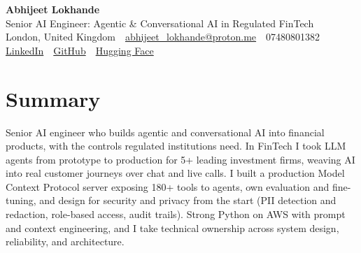 \documentclass[10pt,a4paper]{article}
\newcommand{\sep}{\,\textcolor{accent!60}{\textbar}\,}
\begin{document}
\begin{center}
  {\fontsize{24}{26}\selectfont\bfseries Abhijeet Lokhande}\\[3pt]
  {\color{accent}\large Senior AI Engineer: Agentic \& Conversational AI in Regulated FinTech}\\[5pt]
  {\small
    London, United Kingdom \sep
    \href{mailto:abhijeet_lokhande@proton.me}{abhijeet\_lokhande@proton.me} \sep
    07480801382 \\[2pt]
    \href{https://www.linkedin.com/in/ablds/}{LinkedIn} \sep
    \href{https://github.com/abhijeetscode}{GitHub} \sep
    \href{https://huggingface.co/ab-ai}{Hugging Face}
  }
\end{center}
\vspace{2pt}

\section{Summary}
Senior AI engineer who builds agentic and conversational AI into financial products, with the controls regulated institutions need. In FinTech I took LLM agents from prototype to production for 5+ leading investment firms, weaving AI into real customer journeys over chat and live calls. I built a production Model Context Protocol server exposing 180+ tools to agents, own evaluation and fine-tuning, and design for security and privacy from the start (PII detection and redaction, role-based access, audit trails). Strong Python on AWS with prompt and context engineering, and I take technical ownership across system design, reliability, and architecture.

\end{document}
